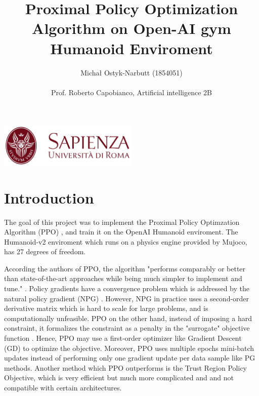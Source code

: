 \documentclass[12pt,a4paper]{article}
\begin{document}
\title{Proximal Policy Optimization Algorithm on Open-AI gym Humanoid Enviroment}
\author{Michał Ostyk-Narbutt (1854051)\\ \\ Prof. Roberto Capobianco, Artificial intelligence 2B}

\maketitle


\begin{center}
\includegraphics[width=0.5\textwidth]{img/sapienza_logo.jpg}
\end{center}
\maketitle
\tableofcontents
\clearpage
\section{Introduction}
The goal of this project was to implement the Proximal Policy Optimzation Algorithm  (PPO) \cite{PPO}, and train it on the OpenAI Humanoid enviroment. The Humanoid-v2 enviroment which runs on a physics engine provided by Mujoco, has 27 degrees of freedom. 

According the authors of PPO, the algorithm "performs comparably or better than state-of-the-art approaches while being much simpler to implement and tune." \cite{PPO}. Policy gradients have a convergence problem which is addressed  by the natural policy gradient (NPG) \cite{NPG}. However, NPG in practice uses a second-order derivative matrix which is hard to scale for large problems, and is computationally unfeasible. PPO on the other hand, instead of imposing a hard constraint, it  formalizes the constraint as a penalty in the "surrogate" objective function \cite{hui}. Hence, PPO may use a first-order optimizer like Gradient Descent (GD) to optimize the objective. Moreover, PPO uses multiple epochs mini-batch updates  instead of performing only one gradient update per data sample like PG methods. Another method which PPO outperforms is the Trust Region Policy Objective, which is very efficient but much more complicated and and not compatible with certain architectures.
\end{document}
